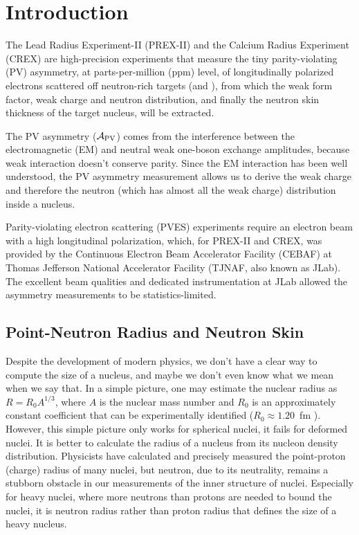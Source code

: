 \chapter{Introduction}
The Lead Radius Experiment-II (PREX-II) and the Calcium Radius Experiment (CREX) are 
high-precision experiments that measure the tiny parity-violating (PV) asymmetry,
at parts-per-million (ppm) level, of longitudinally polarized electrons scattered 
off neutron-rich targets (\Pb and \Ca), from which the weak form factor, weak
charge and neutron distribution, and finally the
neutron skin thickness of the target nucleus, will be extracted.

The PV asymmetry ($\mathcal{A}_{\text{PV}}$) comes from the interference between the 
electromagnetic (EM) and neutral weak one-boson exchange amplitudes, because weak 
interaction doesn't conserve parity. Since the EM 
interaction has been well understood, the PV asymmetry measurement allows 
us to derive the weak charge and therefore the neutron (which has almost all the 
weak charge) distribution inside a nucleus.

Parity-violating electron scattering (PVES) experiments require %
an electron beam with a high longitudinal polarization, which, for PREX-II and CREX,
was provided by the  Continuous Electron Beam Accelerator Facility (CEBAF) 
at Thomas Jefferson National Accelerator Facility (TJNAF, also known as JLab). 
The excellent beam qualities and dedicated instrumentation at JLab allowed 
the asymmetry measurements to be statistics-limited.

\section{Point-Neutron Radius and Neutron Skin}
Despite the development of modern physics, we don't have a clear way to 
compute the size of a nucleus, and maybe we don't even know what we mean 
when we say that.
In a simple picture, one may estimate the nuclear radius as $R = R_0 A^{1/3}$, 
where $A$ is the nuclear mass number 
and $R_0$ is an approximately constant coefficient that can be experimentally 
identified ($R_0 \approx 1.20$~fm \cite{ROYER2008105}). However, this simple 
picture only works for spherical nuclei, it fails for deformed nuclei.
It is better to calculate the radius of a nucleus from its nucleon density
distribution.
Physicists have calculated and precisely measured the point-proton (charge) radius of many nuclei,
but neutron, due to its neutrality, remains a stubborn obstacle in 
our measurements of the inner structure of nuclei. Especially for heavy nuclei,
where more neutrons than protons are needed to bound the nuclei, it is neutron
radius rather than proton radius that defines the size of a heavy nucleus.

